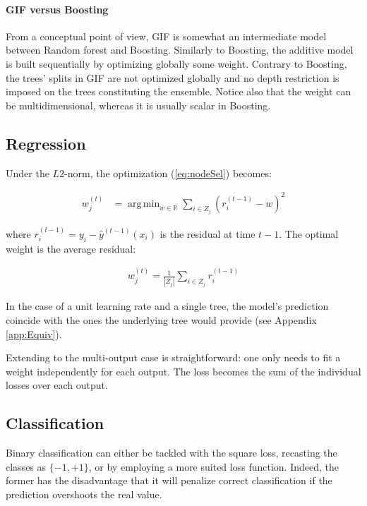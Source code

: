 \documentclass{article}
\DeclareMathOperator*{\argmin}{arg\,min}
\begin{document}
\paragraph{GIF versus Boosting}
From a conceptual point of view, GIF is somewhat an intermediate model 
between Random forest and Boosting. Similarly to Boosting, the additive model 
is  built sequentially by optimizing globally some weight. Contrary to 
Boosting, the trees' splits in GIF are not optimized globally and no depth 
restriction is imposed on the trees constituting the ensemble. Notice also that 
the weight can be multidimensional, whereas it is usually scalar in Boosting.


\subsection{Regression}
\label{subsec:regression}

Under the $L2$-norm, the optimization (\ref{eq:nodeSel}) becomes:

\begin{align}\label{eq:L2min}
w_j^{(t)} &=  \argmin_{w \in \mathbb{R}} \sum_{i \in Z_j} \left(r_i^{(t-1)} - 
w\right)^2
\end{align}

where $r_i^{(t-1)} = y_i - \hat{y}^{(t-1)}(x_i)$ is the residual at time $t-1$.
The optimal weight is the average residual:

\begin{align}\label{eq:L2Solution}
w_j^{(t)} = \frac{1}{|Z_j|} \sum_{i \in Z_j} r_i^{(t-1)}
\end{align}

In the case of a unit learning rate and a single tree, the model's prediction 
coincide with the ones the underlying tree would provide (see Appendix 
\ref{app:Equiv}).

Extending to the multi-output case is straightforward: one only needs to fit a 
weight independently for each output. The loss becomes the sum of the 
individual losses over each output.

\subsection{Classification}
\label{subsec:classification}

Binary classification can either be tackled with the square loss, recasting the 
classes as $\{-1, +1\}$, or by employing a more suited loss function. Indeed, 
the former has the disadvantage that it will penalize correct classification if 
the prediction overshoots the real value.
\end{document}
